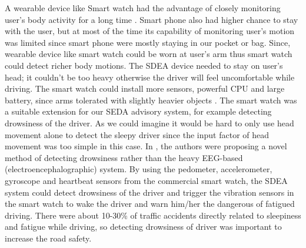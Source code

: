 \documentclass[main.tex]{subfiles}
\begin{document}
A wearable device like Smart watch had the advantage of closely monitoring user’s body activity for a long time \cite{johnson2014literature}. Smart phone also had higher chance to stay with the user, but at most of the time its capability of monitoring user’s motion was limited since smart phone were mostly staying in our pocket or bag. Since, wearable device like smart watch could be worn at user’s arm thus smart watch could detect richer body motions. The SDEA device needed to stay on user’s head; it couldn’t be too heavy otherwise the driver will feel uncomfortable while driving. The smart watch could install more sensors, powerful CPU and large battery, since arms tolerated with slightly heavier objects \cite{johnson2014literature}. The smart watch was a suitable extension for our SEDA advisory system, for example detecting drowsiness of the driver. As we could imagine it would be hard to only use head movement alone to detect the sleepy driver since the input factor of head movement was too simple in this case.  In \cite{rios2015variation}, the authors were proposing a novel method of detecting drowsiness rather than the heavy EEG-based (electroencephalographic) system. By using the pedometer, accelerometer, gyroscope and heartbeat sensors from the commercial smart watch, the SDEA system could detect drowsiness of the driver and trigger the vibration sensors in the smart watch to wake the driver and warn him/her the dangerous of fatigued driving. There were about 10-30\% of traffic accidents directly related to sleepiness and fatigue while driving, so detecting drowsiness of driver was important to increase the road safety.
\end{document}
